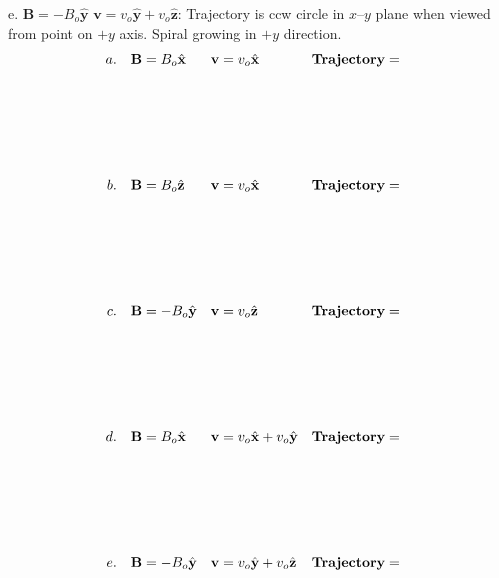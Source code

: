 \documentclass{article}
\begin{document}
e. $\mathbf{B} = -B_o\hat{\mathbf{y}}$ $\mathbf{v} = v_o\hat{\mathbf{y}}+v_o\hat{\mathbf{z}}$: Trajectory is ccw circle in $x$--$y$ plane when viewed from point on $+y$ axis. Spiral growing in $+y$ direction.
\else
\begin{equation}
\begin{align*}
a.\quad & \mathbf{B} =  B_o\hat{\mathbf{x}}&  \mathbf{v} &= v_o\hat{\mathbf{x}} & & \bf{Trajectory =} \\\\\\\\ \\\\
b.\quad & \mathbf{B} =  B_o\hat{\mathbf{z}} &  \mathbf{v} & = v_o\hat{\mathbf{x}}& &  \bf{Trajectory =} \\\\\\\\ \\\\
c.\quad  & \mathbf{B} = -B_o\hat{\mathbf{y}} & \mathbf{v} & = v_o\hat{\mathbf{z}}& & \bf{Trajectory =} \\\\\\\\ \\\\
d.\quad  & \mathbf{B} = B_o\hat{\mathbf{x}} & \mathbf{v} & = v_o\hat{\mathbf{x}}+v_o\hat{\mathbf{y}}& &\bf{Trajectory =}\\\\\\\\ \\\\
e.\quad  & \mathbf{B} = -B_o\hat{\mathbf{y}} & \mathbf{v} & = v_o\hat{\mathbf{y}}+v_o\hat{\mathbf{z}}& & \bf{Trajectory =} & 
\end{align*}
\end{equation}
\fi
\ifsolutions\else
\end{document}
